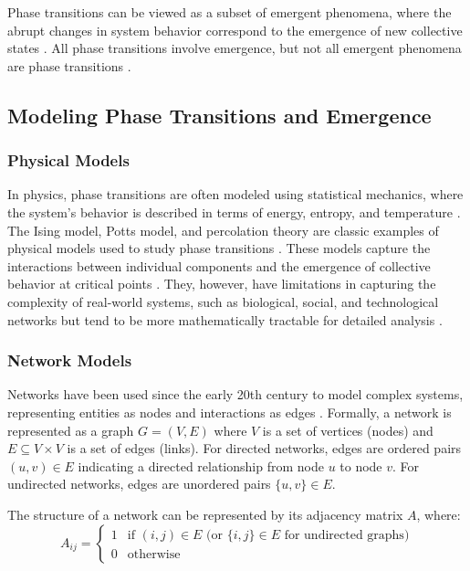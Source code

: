 Phase transitions can be viewed as a subset of emergent phenomena, where the abrupt changes in system behavior correspond to the emergence of new collective states \citep{sethna2006statistical, goldenfeld1992lectures}. All phase transitions involve emergence, but not all emergent phenomena are phase transitions \citep{bar2013computability}.

\subsection{Modeling Phase Transitions and Emergence}

\subsubsection{Physical Models}

In physics, phase transitions are often modeled using statistical mechanics, where the system's behavior is described in terms of energy, entropy, and temperature \citep{stanley1971phase, kadanoff2000statistical}. The Ising model, Potts model, and percolation theory are classic examples of physical models used to study phase transitions \citep{onsager1944crystal, stauffer2018introduction}. These models capture the interactions between individual components and the emergence of collective behavior at critical points \citep{binney1992theory}. They, however, have limitations in capturing the complexity of real-world systems, such as biological, social, and technological networks but tend to be more mathematically tractable for detailed analysis \citep{newman2011structure}.

\subsubsection{Network Models}

Networks have been used since the early 20th century to model complex systems, representing entities as nodes and interactions as edges \citep{watts1998collective, barabasi1999emergence}. Formally, a network is represented as a graph $G = (V, E)$ where $V$ is a set of vertices (nodes) and $E \subseteq V \times V$ is a set of edges (links). For directed networks, edges are ordered pairs $(u, v) \in E$ indicating a directed relationship from node $u$ to node $v$. For undirected networks, edges are unordered pairs $\{u, v\} \in E$.

The structure of a network can be represented by its adjacency matrix $A$, where:
\begin{equation}
A_{ij} =
\begin{cases}
1 & \text{if } (i,j) \in E \text{ (or } \{i,j\} \in E \text{ for undirected graphs)} \\
0 & \text{otherwise}
\end{cases}
\end{equation}

